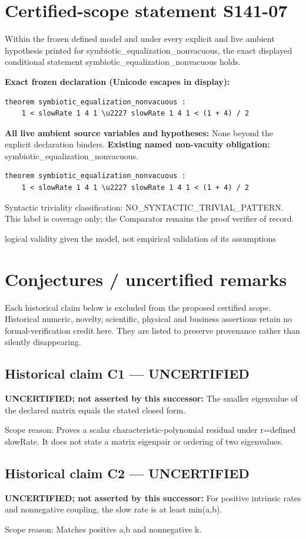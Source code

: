 \documentclass[11pt]{article}
\begin{document}
\section*{Certified-scope statement S141-07}
Within the frozen defined model and under every explicit and live ambient hypothesis printed for symbiotic\_equalization\_nonvacuous, the exact displayed conditional statement symbiotic\_equalization\_nonvacuous holds.
\par\noindent\textbf{Exact frozen declaration (Unicode escapes in display):}
\begin{verbatim}
theorem symbiotic_equalization_nonvacuous :
    1 < slowRate 1 4 1 \u2227 slowRate 1 4 1 < (1 + 4) / 2
\end{verbatim}
\noindent\textbf{All live ambient source variables and hypotheses:}
None beyond the explicit declaration binders.
\noindent\textbf{Existing named non-vacuity obligation:} symbiotic\_equalization\_nonvacuous.
\begin{verbatim}
theorem symbiotic_equalization_nonvacuous :
    1 < slowRate 1 4 1 \u2227 slowRate 1 4 1 < (1 + 4) / 2
\end{verbatim}
\noindent Syntactic triviality classification: NO\_SYNTACTIC\_TRIVIAL\_PATTERN. This label is coverage only; the Comparator remains the proof verifier of record.
\par\noindent logical validity given the model, not empirical validation of its assumptions
\section*{Conjectures / uncertified remarks}
Each historical claim below is excluded from the proposed certified scope. Historical numeric, novelty, scientific, physical and business assertions retain no formal-verification credit here. They are listed to preserve provenance rather than silently disappearing.
\subsection*{Historical claim C1 --- UNCERTIFIED}
\textbf{UNCERTIFIED; not asserted by this successor:} The smaller eigenvalue of the declared matrix equals the stated closed form.
\par Scope reason: Proves a scalar characteristic-polynomial residual under r=defined slowRate. It does not state a matrix eigenpair or ordering of two eigenvalues.
\subsection*{Historical claim C2 --- UNCERTIFIED}
\textbf{UNCERTIFIED; not asserted by this successor:} For positive intrinsic rates and nonnegative coupling, the slow rate is at least min(a,b).
\par Scope reason: Matches positive a,b and nonnegative k.
\end{document}
